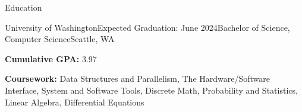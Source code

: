 \documentclass{resume} %
\begin{document}
\vspace{-0.5em} %


\begin{rSection}{Education}

\begin{education}{University of Washington}{Expected Graduation: June 2024}{Bachelor of Science, Computer Science}{Seattle, WA}
\item {\bf Cumulative GPA:} 3.97
\item {\bf Coursework:} Data Structures and Parallelism, The Hardware/Software Interface, System and Software Tools, Discrete Math, Probability and Statistics, Linear Algebra, Differential Equations
\end{education}

%
\end{rSection}

\end{document}
